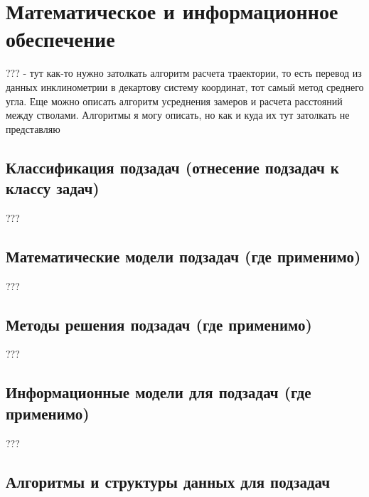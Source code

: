\newpage
\section{Математическое и информационное обеспечение }

??? - тут как-то нужно затолкать алгоритм расчета траектории, то есть перевод из данных инклинометрии в декартову систему координат,
тот самый метод среднего угла. Еще можно описать алгоритм усреднения замеров и расчета расстояний между стволами. Алгоритмы я могу описать,
но как и куда их тут затолкать не представляю

\subsection{Классификация подзадач (отнесение подзадач к классу задач)}
???

\subsection{Математические модели подзадач (где применимо)}
???

\subsection{Методы решения подзадач (где применимо)}
???

\subsection{Информационные модели для подзадач (где применимо)}
???

\subsection{Алгоритмы и структуры данных для подзадач}
